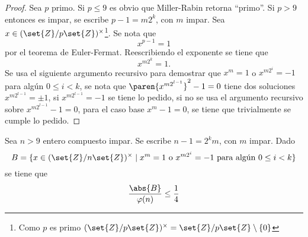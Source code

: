 \documentclass{ayudantia}
\begin{document}
\begin{proof}
    Sea \(p\) primo. Si \(p\leq9\) es obvio que Miller-Rabin retorna ``primo''. Si \(p>9\) entonces es impar, se escribe \(p-1=m2^k\), con \(m\) impar. Sea \(x\in(\set{Z}/p\set{Z})^\times\)\footnote{Como \(p\) es primo \((\set{Z}/p\set{Z})^\times=\set{Z}/p\set{Z}\setminus\{0\}\)}. Se nota que
    \begin{equation*}
        x^{p-1}=1
    \end{equation*}
    por el teorema de Euler-Fermat. Reescribiendo el exponente se tiene que
    \begin{equation*}
        x^{m2^k}=1.
    \end{equation*}
    Se usa el siguiente argumento recursivo para demostrar que \(x^m=1\) o \(x^{m2^i}=-1\) para algún \(0\leq i<k\), se nota que \(\paren{x^{m2^{l-1}}}^2-1=0\) tiene dos soluciones \(x^{m2^{l-1}}=\pm1\), si \(x^{m2^{l-1}}=-1\) se tiene lo pedido, si no se usa el argumento recursivo sobre \(x^{m2^{l-1}}-1=0\), para el caso base \(x^m-1=0\), se tiene que trivialmente se cumple lo pedido.
\end{proof}
\begin{thm}
    Sea \(n>9\) entero compuesto impar. Se escribe \(n-1=2^km\), con \(m\) impar. Dado
    \begin{equation*}
        B=\{x\in(\set{Z}/n\set{Z})^\times\mid x^m=1\text{ o }x^{m2^i}=-1\text{ para algún }0\leq i<k\}
    \end{equation*}
    se tiene que
    \begin{equation*}
        \frac{\abs{B}}{\varphi(n)}\leq\frac14
    \end{equation*}
\end{thm}
\end{document}
